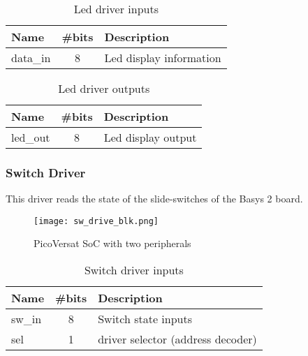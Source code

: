 \begin{table}[!htbp]
    \centering
    \caption{Led driver inputs}
    \label{tab:ledIn}
    \begin{tabular}{@{}lll@{}}
    \toprule
    Name     & \#bits                & Description             \\ \midrule
    data\_in & \multicolumn{1}{c}{8} & Led display information \\ \bottomrule
    \end{tabular}
    \end{table}

\begin{table}[!htbp]
    \centering
    \caption{Led driver outputs}
    \label{tab:ledOut}
    \begin{tabular}{@{}lll@{}}
    \toprule
    Name     & \#bits                & Description        \\ \midrule
    led\_out & \multicolumn{1}{c}{8} & Led display output \\ \bottomrule
    \end{tabular}
    \end{table}



\subsubsection{Switch Driver}

This driver reads the state of the slide-switches of the Basys 2 board.

\begin{figure}[!ht]
    \centerline{\texttt{[image: sw\_drive\_blk.png]}}
    \vspace{0cm}\caption{PicoVersat SoC with two peripherals}
    \label{fig:periphs}
\end{figure}

\begin{table}[ht]
    \centering
    \caption{Switch driver inputs}
    \label{tab:swIn}
    \begin{tabular}{@{}lcl@{}}
    \toprule
    Name   & \multicolumn{1}{l}{\#bits} & Description                       \\ \midrule
    sw\_in & 8                          & Switch state inputs               \\
    sel    & 1                          & driver selector (address decoder) \\ \bottomrule
    \end{tabular}
    \end{table}

